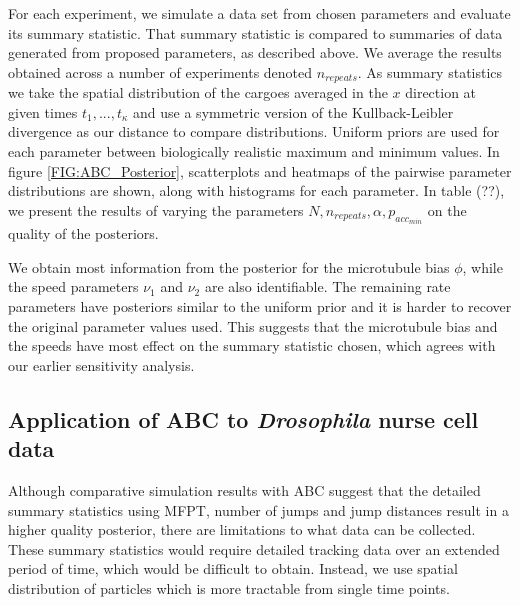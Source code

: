 \documentclass[twocolumn]{biophys}
\begin{document}
For each experiment, we simulate a data set from chosen parameters and evaluate its summary statistic. 
That summary statistic is compared to summaries of data generated from proposed parameters, as described above.
We average the results obtained across a number of experiments denoted $n_{repeats}$.
As summary statistics we take the spatial distribution of the cargoes averaged in the $x$ direction at given times $t_1,...,t_{\kappa}$ and use a symmetric version of the Kullback-Leibler divergence as our distance to compare distributions.
Uniform priors are used for each parameter between biologically realistic maximum and minimum values.
In figure \ref{FIG:ABC_Posterior}, scatterplots and heatmaps of the pairwise parameter distributions are shown, along with histograms for each parameter. 
In table (??), we present the results of varying the parameters $N, n_{repeats}, \alpha, p_{acc_{min}}$ on the quality of the posteriors.

We obtain most information from the posterior for the microtubule bias $\phi$, while the speed parameters $\nu_1$ and $\nu_2$ are also identifiable. 
The remaining rate parameters have posteriors similar to the uniform prior and it is harder to recover the original parameter values used.
This suggests that the microtubule bias and the speeds have most effect on the summary statistic chosen, which agrees with our earlier sensitivity analysis.

\subsection{Application of ABC to \textit{Drosophila} nurse cell data}
Although comparative simulation results with ABC suggest that the detailed summary statistics using MFPT, number of jumps and jump distances result in a higher quality posterior, there are limitations to what data can be collected.
These summary statistics would require detailed tracking data over an extended period of time, which would be difficult to obtain. 
Instead, we use spatial distribution of particles which is more tractable from single time points.
\end{document}
